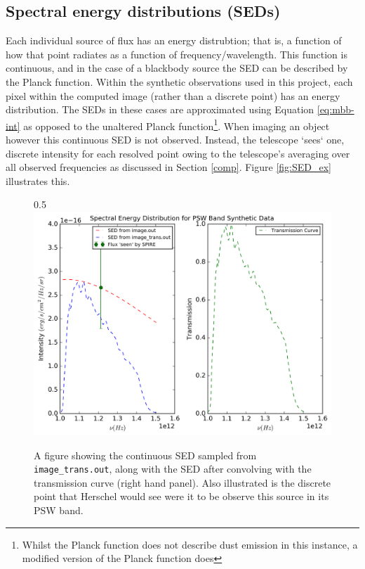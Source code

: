 \documentclass{report}
\begin{document}
\subsection{Spectral energy distributions (SEDs)}
Each individual source of flux has an energy distrubtion; that is, a function of how that point radiates as a function of frequency/wavelength. This function is continuous, and in the case of a blackbody source the SED can be described by the Planck function. Within the synthetic observations used in this project, each pixel within the computed image (rather than a discrete point) has an energy distribution. The SEDs in these cases are approximated using Equation \ref{eq:mbb-int} as opposed to the unaltered Planck function\footnote{Whilst the Planck function does not describe dust emission in this instance, a modified version of the Planck function does}. When imaging an object however this continuous SED is not observed. Instead, the telescope `sees` one, discrete intensity for each resolved point owing to the telescope's averaging over all observed frequencies as discussed in Section \ref{comp}. Figure \ref{fig:SED_ex} illustrates this.

\begin{figure}[h]{0.5\textwidth}
  \centering
  \includegraphics[scale=0.5]{../img/spectrum_psw_unweighted_v2}
  \caption[A figure showing the continuous SED sampled from \texttt{image\_trans.out}, along with the SED after convolving with the transmission curve (right hand panel). Also illustrated is the discrete point that Herschel would see were it to be observe this source in its PSW band.]{A figure showing the continuous SED sampled from \texttt{image\_trans.out}, along with the SED after convolving with the transmission curve (right hand panel). Also illustrated is the discrete point that Herschel would see were it to be observe this source in its PSW band.}
\end{figure}\label{fig:SED_ex}
\end{document}
